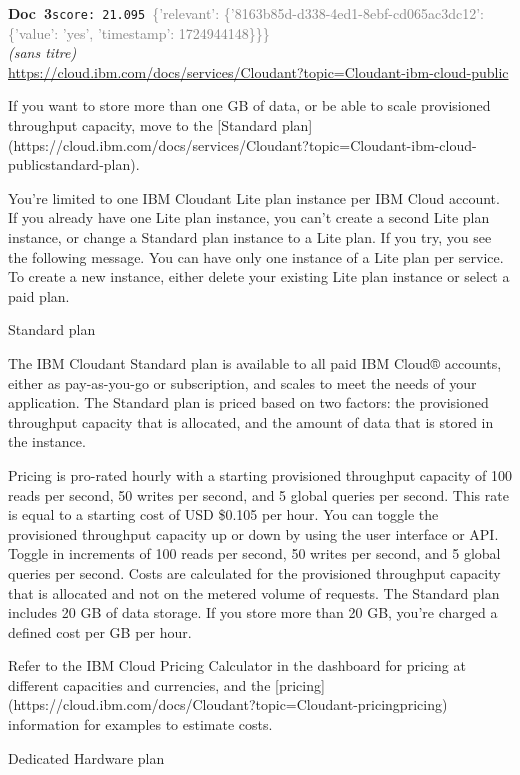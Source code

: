 \documentclass[a4paper,11pt]{article}
\begin{document}
\begin{docenv}
{\footnotesize\textcolor{doccolor}{\textbf{Doc~3}}}\hfill{\tiny\texttt{score:~21.095}}\ {\tiny\textcolor{gray}{\{'relevant': \{'8163b85d-d338-4ed1-8ebf-cd065ac3dc12': \{'value': 'yes', 'timestamp': 1724944148\}\}\}}}\\[3pt]
{\small\textit{(sans titre)}}\\[2pt]
{\tiny\url{https://cloud.ibm.com/docs/services/Cloudant?topic=Cloudant-ibm-cloud-public}}\\[4pt]
{\footnotesize 
If you want to store more than one GB of data, or be able to scale provisioned throughput capacity, move to the [Standard plan](https://cloud.ibm.com/docs/services/Cloudant?topic=Cloudant-ibm-cloud-publicstandard-plan).

You're limited to one IBM Cloudant Lite plan instance per IBM Cloud account. If you already have one Lite plan instance, you can't create a second Lite plan instance, or change a Standard plan instance to a Lite plan. If you try, you see the following message. You can have only one instance of a Lite plan per service. To create a new instance, either delete your existing Lite plan instance or select a paid plan.





 Standard plan 

The IBM Cloudant Standard plan is available to all paid IBM Cloud® accounts, either as pay-as-you-go or subscription, and scales to meet the needs of your application. The Standard plan is priced based on two factors: the provisioned throughput capacity that is allocated, and the amount of data that is stored in the instance.

Pricing is pro-rated hourly with a starting provisioned throughput capacity of 100 reads per second, 50 writes per second, and 5 global queries per second. This rate is equal to a starting cost of USD \$0.105 per hour. You can toggle the provisioned throughput capacity up or down by using the user interface or API. Toggle in increments of 100 reads per second, 50 writes per second, and 5 global queries per second. Costs are calculated for the provisioned throughput capacity that is allocated and not on the metered volume of requests. The Standard plan includes 20 GB of data storage. If you store more than 20 GB, you're charged a defined cost per GB per hour.

Refer to the IBM Cloud Pricing Calculator in the dashboard for pricing at different capacities and currencies, and the [pricing](https://cloud.ibm.com/docs/Cloudant?topic=Cloudant-pricingpricing) information for examples to estimate costs.





 Dedicated Hardware plan}
\end{docenv}
\end{document}
